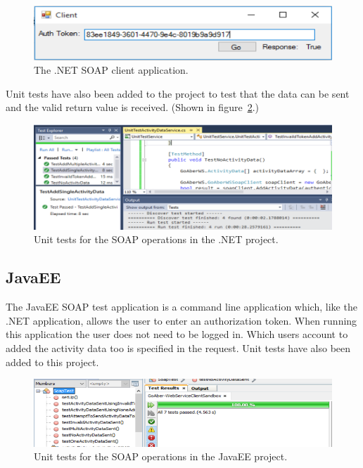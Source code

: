 \begin{figure}[H]
\begin{center}
\includegraphics[scale=0.3]{images/testing/clientAuthTokenNET.png} 
\caption{The .NET SOAP client application.}
\label{fig:testing_authTokenNet}
\end{center}
\end{figure}


Unit tests have also been added to the project to test that the data can be sent and the valid return value is received. (Shown in figure~\ref{fig:testing_SoapUnitTestsNET}.)

\begin{figure}[H]
\begin{center}
\includegraphics[scale=0.3]{images/testing/SoapUnitTestsNET.png} 
\caption{Unit tests for the SOAP operations in the .NET project.}
\label{fig:testing_SoapUnitTestsNET}
\end{center}
\end{figure}


\subsection{JavaEE}

The JavaEE SOAP test application is a command line application which, like the .NET application, allows the user to enter an authorization token. When running this application the user does not need to be logged in. Which users account to added the activity data too is specified in the request. Unit tests have also been added to this project.

\begin{figure}[H]
\begin{center}
\includegraphics[scale=0.3]{images/testing/SoapUnitTestsJavaEE.png} 
\caption{Unit tests for the SOAP operations in the JavaEE project.}
\label{fig:testing_SoapUnitTestsJavaEE}
\end{center}
\end{figure}


